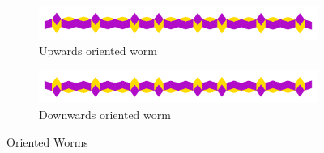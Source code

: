 \documentclass[
  oneside,
  11pt, a4paper,
  footinclude=true,
  headinclude=true,
  cleardoublepage=empty
]{scrbook}
\begin{document}
\begin{figure}[H]
\centering
\begin{subfigure}{\textwidth}
\centering
\includegraphics[width=\textwidth]{reWorm}
\caption{Upwards oriented worm}
\end{subfigure}

\begin{subfigure}{\textwidth}
\centering
\includegraphics[width=\textwidth]{reWormDown}
\caption{Downwards oriented worm}
\end{subfigure}

\caption{Oriented Worms}
\label{fig:worm}
\end{figure}
\end{document}
